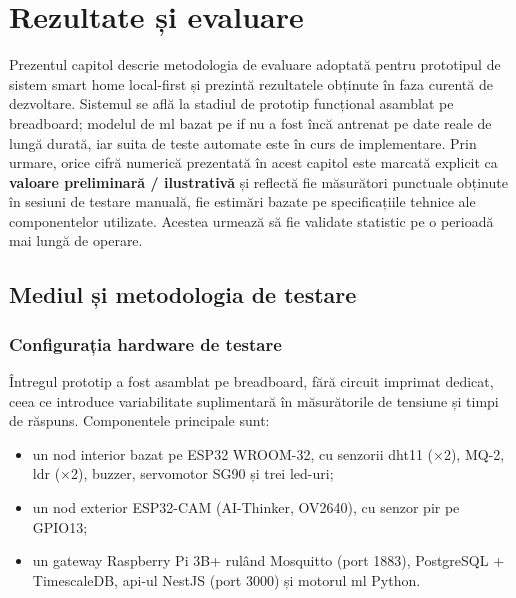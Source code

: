 \chapter{Rezultate și evaluare}
\label{ch:rezultate}

Prezentul capitol descrie metodologia de evaluare adoptată pentru prototipul de sistem smart home
local-first și prezintă rezultatele obținute în faza curentă de dezvoltare. Sistemul se află la
stadiul de prototip funcțional asamblat pe breadboard; modelul de \gls{ml} bazat pe
\gls{if} nu a fost încă antrenat pe date reale de lungă durată, iar suita de teste automate
este în curs de implementare. Prin urmare, orice cifră numerică prezentată în acest capitol este
marcată explicit ca \textbf{valoare preliminară / ilustrativă} și reflectă fie măsurători punctuale
obținute în sesiuni de testare manuală, fie estimări bazate pe specificațiile tehnice ale
componentelor utilizate. Acestea urmează să fie validate statistic pe o perioadă mai lungă de
operare.

\section{Mediul și metodologia de testare}
\label{sec:mediu-testare}

\subsection{Configurația hardware de testare}

Întregul prototip a fost asamblat pe breadboard, fără circuit imprimat dedicat, ceea ce introduce
variabilitate suplimentară în măsurătorile de tensiune și timpi de răspuns. Componentele principale
sunt:

\begin{itemize}
  \item un nod interior bazat pe ESP32 WROOM-32, cu senzorii \gls{dht}11 (×2), MQ-2,
        \gls{ldr} (×2), buzzer, servomotor SG90 și trei \gls{led}-uri;
  \item un nod exterior ESP32-CAM (AI-Thinker, OV2640), cu senzor \gls{pir} pe GPIO13;
  \item un gateway Raspberry Pi 3B+ rulând Mosquitto (port 1883), PostgreSQL + TimescaleDB,
        \gls{api}-ul NestJS (port 3000) și motorul \gls{ml} Python.
\end{itemize}

